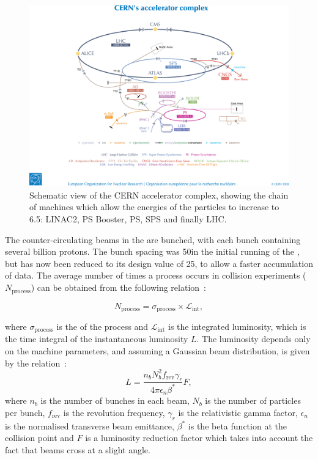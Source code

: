 \begin{figure}[h]
\centering
\includegraphics[width=1.0\textwidth]{detectorFigures/accelerators.jpg}
\caption{Schematic view of the CERN accelerator complex, showing the chain of machines which allow the energies of the particles to increase to 6.5\TeV: LINAC2, PS Booster, PS, SPS and finally LHC\quad\cite{Christiane:1260465}.}
\label{fig:accelerators}
\end{figure}

The counter-circulating beams in the \LHC are bunched, with each bunch containing several billion protons. The bunch spacing was 50\ns in the initial running of the \LHC, but has now been reduced to its design value of 25\ns, to allow a faster accumulation of data. The average number of times a process occurs in collision experiments ($N_{\text{process}}$) can be obtained from the following relation~\cite{Benedikt:823808}:

\begin{equation}
\label{eq:NeqSigmaL}
N_{\text{process}} = \sigma_{\text{process}}\times \mathcal{L}_{\text{int}},
\end{equation}

where $\sigma_{\text{process}}$ is the \crosssection of the process and $\mathcal{L}_{\text{int}}$ is the integrated luminosity, which is the time integral of the instantaneous luminosity $L$. The luminosity depends only on the machine parameters, and assuming a Gaussian beam distribution, is given by the relation~\cite{Benedikt:823808}:
\begin{equation}
\label{eq:NeqSigmaL}
L = \frac{n_{b} N^{2}_{b} f_{\text{rev}} \gamma_{r}}{4 \pi \epsilon_{n} \beta^{*}} F,
\end{equation}
where $n_{b}$ is the number of bunches in each beam, $N_{b}$ is the number of particles per bunch, $f_{\text{rev}}$ is the revolution frequency, $\gamma_{r}$ is the relativistic gamma factor, $\epsilon_{n}$ is the normalised transverse beam emittance, $\beta^{*}$ is the beta function at the collision point and $F$ is a luminosity reduction factor which takes into account the fact that beams cross at a slight angle. 

